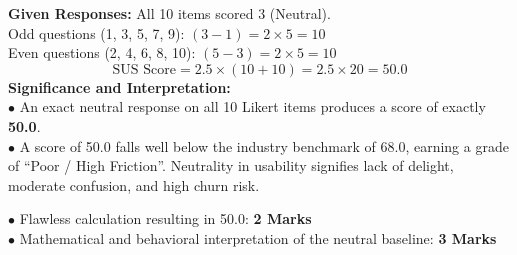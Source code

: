 \begin{solutionbox}
\textbf{Given Responses:} All 10 items scored 3 (Neutral).\\
Odd questions (1, 3, 5, 7, 9): $(3 - 1) = 2 \times 5 = 10$\\
Even questions (2, 4, 6, 8, 10): $(5 - 3) = 2 \times 5 = 10$\\
\[
\text{SUS Score} = 2.5 \times (10 + 10) = 2.5 \times 20 = \mathbf{50.0}
\]
\textbf{Significance and Interpretation:}\\
$\bullet$ An exact neutral response on all 10 Likert items produces a score of exactly \textbf{50.0}.\\
$\bullet$ A score of 50.0 falls well below the industry benchmark of 68.0, earning a grade of ``Poor / High Friction''. Neutrality in usability signifies lack of delight, moderate confusion, and high churn risk.
\begin{markingrubric}
$\bullet$ Flawless calculation resulting in 50.0: \textbf{2 Marks}\\
$\bullet$ Mathematical and behavioral interpretation of the neutral baseline: \textbf{3 Marks}
\end{markingrubric}
\end{solutionbox}
